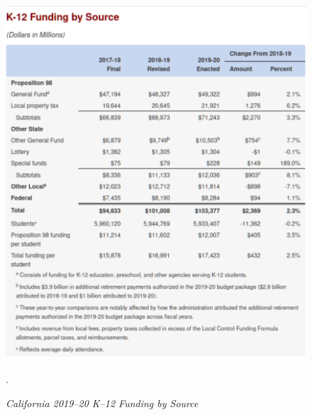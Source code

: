 \begin{figure}[htp]
  \centering
  \caption[California 2019–20 K–12 Funding by Source]{\textit{California 2019–20 K–12 Funding by Source}}\label{fig:2019–20_K–12_Funding}
  \includegraphics[width=\textwidth]{2019-20_K-12_Funding_by_Source.pdf}\\ %
  \footnotesize\raggedright\textcite{LAO2021}.
\end{figure}

